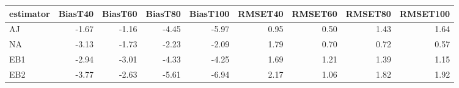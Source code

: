 \begin{table}[ht]
\centering
\begin{tabular}{lrrrrrrrr}
  \toprule
estimator & BiasT40 & BiasT60 & BiasT80 & BiasT100 & RMSET40 & RMSET60 & RMSET80 & RMSET100 \\ 
  \midrule
AJ & -1.67 & -1.16 & -4.45 & -5.97 & 0.95 & 0.50 & 1.43 & 1.64 \\ 
  NA & -3.13 & -1.73 & -2.23 & -2.09 & 1.79 & 0.70 & 0.72 & 0.57 \\ 
  EB1 & -2.94 & -3.01 & -4.33 & -4.25 & 1.69 & 1.21 & 1.39 & 1.15 \\ 
  EB2 & -3.77 & -2.63 & -5.61 & -6.94 & 2.17 & 1.06 & 1.82 & 1.92 \\ 
   \bottomrule
\end{tabular}
\end{table}
